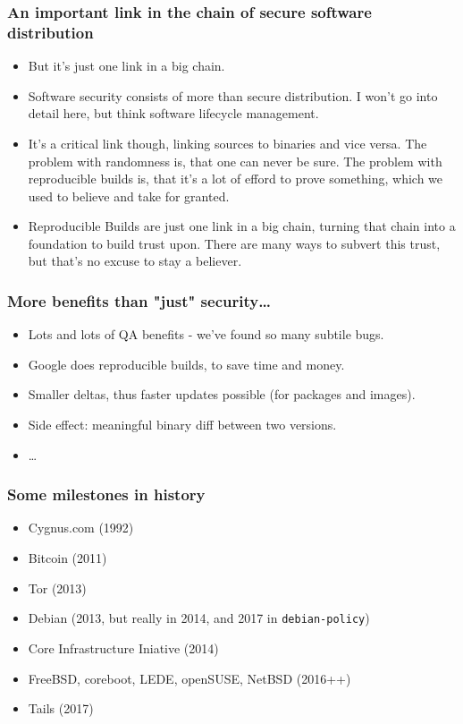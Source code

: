 \documentclass[14pt,aspectratio=169]{beamer}
\begin{document}
\begin{frame}[fragile]
 \frametitle{An important link in the chain of secure software distribution}
 \begin{itemize}
  \item But it's just one link in a big chain.
  \item Software security consists of more than secure distribution. I won't go into detail here, but think software lifecycle management.
  \item<2> It's a critical link though, linking sources to binaries and vice versa. The problem with randomness is, that one can never be sure. The problem with reproducible builds is, that it's a lot of efford to prove something, which we used to believe and take for granted.
  \item<2> Reproducible Builds are just one link in a big chain, turning that chain into a foundation to build trust upon. There are many ways to subvert this trust, but that's no excuse to stay a believer.
 \end{itemize}
\end{frame}


\begin{frame}[fragile]
 \frametitle{More benefits than "just" security…}
 \begin{itemize}
  \item Lots and lots of QA benefits - we've found so many subtile bugs.
  \item<2-5> Google does reproducible builds, to save time and money.
  \item<3-5> Smaller deltas, thus faster updates possible (for packages and
  images).
  \item<4-5> Side effect: meaningful binary diff between two versions.
  \item<5> …
 \end{itemize}
\end{frame}


\begin{frame}
 \frametitle{Some milestones in history}
 \begin{itemize}
\item<7> Cygnus.com (1992)
\item Bitcoin (2011)
\item<2-7> Tor (2013)
\item<3-7> Debian (2013, but really in 2014, and 2017 in \texttt{debian-policy})
\item<4-7> Core Infrastructure Iniative (2014)
\item<5-7> FreeBSD, coreboot, LEDE, openSUSE, NetBSD (2016++)
\item<6-7> Tails (2017)
 \end{itemize}
\end{frame}
\end{document}
